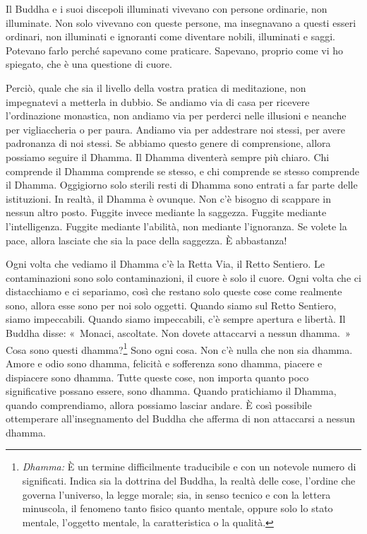 Il Buddha e i suoi discepoli illuminati vivevano con persone ordinarie,
non illuminate. Non solo vivevano con queste persone, ma insegnavano a
questi esseri ordinari, non illuminati e ignoranti come diventare
nobili, illuminati e saggi. Potevano farlo perché sapevano come
praticare. Sapevano, proprio come vi ho spiegato, che è una questione di
cuore.

Perciò, quale che sia il livello della vostra pratica di meditazione,
non impegnatevi a metterla in dubbio. Se andiamo via di casa per
ricevere l'ordinazione monastica, non andiamo via per perderci nelle
illusioni e neanche per vigliaccheria o per paura. Andiamo via per
addestrare noi stessi, per avere padronanza di noi stessi. Se abbiamo
questo genere di comprensione, allora possiamo seguire il Dhamma. Il
Dhamma diventerà sempre più chiaro. Chi comprende il Dhamma comprende se
stesso, e chi comprende se stesso comprende il Dhamma. Oggigiorno solo
sterili resti di Dhamma sono entrati a far parte delle istituzioni. In
realtà, il Dhamma è ovunque. Non c'è bisogno di scappare in nessun altro
posto. Fuggite invece mediante la saggezza. Fuggite mediante
l'intelligenza. Fuggite mediante l'abilità, non mediante l'ignoranza. Se
volete la pace, allora lasciate che sia la pace della saggezza. È
abbastanza!

Ogni volta che vediamo il Dhamma c'è la Retta Via, il Retto Sentiero. Le
contaminazioni sono solo contaminazioni, il cuore è solo il cuore. Ogni
volta che ci distacchiamo e ci separiamo, così che restano solo queste
cose come realmente sono, allora esse sono per noi solo oggetti. Quando
siamo sul Retto Sentiero, siamo impeccabili. Quando siamo impeccabili,
c'è sempre apertura e libertà. Il Buddha disse: «~Monaci, ascoltate. Non
dovete attaccarvi a nessun dhamma.~» Cosa sono questi
dhamma?\footnote{\emph{Dhamma:} È un termine
  difficilmente traducibile e con un notevole numero di significati.
  Indica sia la dottrina del Buddha, la realtà delle cose, l'ordine che
  governa l'universo, la legge morale; sia, in senso tecnico e con la
  lettera minuscola, il fenomeno tanto fisico quanto mentale, oppure
  solo lo stato mentale, l'oggetto mentale, la caratteristica o la
  qualità.} Sono ogni cosa. Non c'è nulla che non sia dhamma.
Amore e odio sono dhamma, felicità e sofferenza sono
dhamma, piacere e dispiacere sono dhamma. Tutte queste
cose, non importa quanto poco significative possano essere, sono
dhamma. Quando pratichiamo il Dhamma, quando comprendiamo, allora
possiamo lasciar andare. È così possibile ottemperare all'insegnamento
del Buddha che afferma di non attaccarsi a nessun dhamma.


